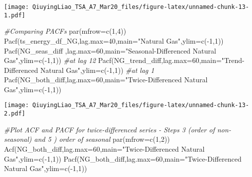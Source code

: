 \documentclass[
]{article}
\newenvironment{Shaded}{\begin{snugshade}}{\end{snugshade}}
\newcommand{\AttributeTok}[1]{\textcolor[rgb]{0.77,0.63,0.00}{#1}}
\newcommand{\CommentTok}[1]{\textcolor[rgb]{0.56,0.35,0.01}{\textit{#1}}}
\newcommand{\DecValTok}[1]{\textcolor[rgb]{0.00,0.00,0.81}{#1}}
\newcommand{\FunctionTok}[1]{\textcolor[rgb]{0.00,0.00,0.00}{#1}}
\newcommand{\NormalTok}[1]{#1}
\newcommand{\SpecialCharTok}[1]{\textcolor[rgb]{0.00,0.00,0.00}{#1}}
\newcommand{\StringTok}[1]{\textcolor[rgb]{0.31,0.60,0.02}{#1}}
\begin{document}
\texttt{[image: QiuyingLiao\_TSA\_A7\_Mar20\_files/figure-latex/unnamed-chunk-13-1.pdf]}

\begin{Shaded}
\begin{Highlighting}[]
\CommentTok{\#Comparing PACFs}
\FunctionTok{par}\NormalTok{(}\AttributeTok{mfrow=}\FunctionTok{c}\NormalTok{(}\DecValTok{1}\NormalTok{,}\DecValTok{4}\NormalTok{))}
\FunctionTok{Pacf}\NormalTok{(ts\_energy\_df\_NG,}\AttributeTok{lag.max=}\DecValTok{40}\NormalTok{,}\AttributeTok{main=}\StringTok{"Natural Gas"}\NormalTok{,}\AttributeTok{ylim=}\FunctionTok{c}\NormalTok{(}\SpecialCharTok{{-}}\DecValTok{1}\NormalTok{,}\DecValTok{1}\NormalTok{))}
\FunctionTok{Pacf}\NormalTok{(NG\_seas\_diff ,}\AttributeTok{lag.max=}\DecValTok{60}\NormalTok{,}\AttributeTok{main=}\StringTok{"Seasonal{-}Differenced Natural Gas"}\NormalTok{,}\AttributeTok{ylim=}\FunctionTok{c}\NormalTok{(}\SpecialCharTok{{-}}\DecValTok{1}\NormalTok{,}\DecValTok{1}\NormalTok{)) }\CommentTok{\#at lag 12}
\FunctionTok{Pacf}\NormalTok{(NG\_trend\_diff,}\AttributeTok{lag.max=}\DecValTok{60}\NormalTok{,}\AttributeTok{main=}\StringTok{"Trend{-}Differenced Natural Gas"}\NormalTok{,}\AttributeTok{ylim=}\FunctionTok{c}\NormalTok{(}\SpecialCharTok{{-}}\DecValTok{1}\NormalTok{,}\DecValTok{1}\NormalTok{)) }\CommentTok{\#at lag 1}
\FunctionTok{Pacf}\NormalTok{(NG\_both\_diff,}\AttributeTok{lag.max=}\DecValTok{60}\NormalTok{,}\AttributeTok{main=}\StringTok{"Twice{-}Differenced Natural Gas"}\NormalTok{,}\AttributeTok{ylim=}\FunctionTok{c}\NormalTok{(}\SpecialCharTok{{-}}\DecValTok{1}\NormalTok{,}\DecValTok{1}\NormalTok{))}
\end{Highlighting}
\end{Shaded}

\texttt{[image: QiuyingLiao\_TSA\_A7\_Mar20\_files/figure-latex/unnamed-chunk-13-2.pdf]}

\begin{Shaded}
\begin{Highlighting}[]
\CommentTok{\#Plot ACF and PACF for twice{-}differenced series {-} Steps 3 (order of non{-}seasonal) and 5 ) order of seasonal}
\FunctionTok{par}\NormalTok{(}\AttributeTok{mfrow=}\FunctionTok{c}\NormalTok{(}\DecValTok{1}\NormalTok{,}\DecValTok{2}\NormalTok{))}
\FunctionTok{Acf}\NormalTok{(NG\_both\_diff,}\AttributeTok{lag.max=}\DecValTok{60}\NormalTok{,}\AttributeTok{main=}\StringTok{"Twice{-}Differenced Natural Gas"}\NormalTok{,}\AttributeTok{ylim=}\FunctionTok{c}\NormalTok{(}\SpecialCharTok{{-}}\DecValTok{1}\NormalTok{,}\DecValTok{1}\NormalTok{))}
\FunctionTok{Pacf}\NormalTok{(NG\_both\_diff,}\AttributeTok{lag.max=}\DecValTok{60}\NormalTok{,}\AttributeTok{main=}\StringTok{"Twice{-}Differenced Natural Gas"}\NormalTok{,}\AttributeTok{ylim=}\FunctionTok{c}\NormalTok{(}\SpecialCharTok{{-}}\DecValTok{1}\NormalTok{,}\DecValTok{1}\NormalTok{))}
\end{Highlighting}
\end{Shaded}
\end{document}

